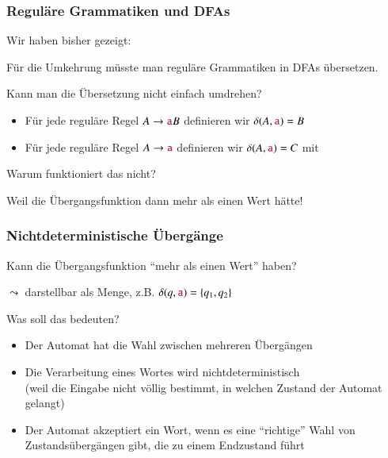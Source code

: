 \documentclass[aspectratio=1610,onlymath]{beamer}
\begin{document}
\begin{frame}\frametitle{Reguläre Grammatiken und DFAs}

Wir haben bisher gezeigt:


Für die Umkehrung müsste man reguläre Grammatiken in DFAs übersetzen.
\bigskip\pause

Kann man die Übersetzung nicht einfach umdrehen?
\begin{itemize}
\item Für jede reguläre Regel $A\to\mathtt{\textcolor{purple}{a}}B$ definieren wir $\delta(A,\mathtt{\textcolor{purple}{a}})=B$
\item Für jede reguläre Regel $A\to\mathtt{\textcolor{purple}{a}}$ definieren wir $\delta(A,\mathtt{\textcolor{purple}{a}})=C$ mit 
\end{itemize}
Warum funktioniert das nicht?\pause

\alert{Weil die Übergangsfunktion dann mehr als einen Wert hätte!}\medskip


\end{frame}

\begin{frame}\frametitle{Nichtdeterministische Übergänge}

Kann die Übergangsfunktion "`mehr als einen Wert"' haben?
\medskip

$\leadsto$ darstellbar als Menge, z.B. $\delta(q,\mathtt{\textcolor{purple}{a}}) =\{q_1, q_2\}$
\bigskip

Was soll das bedeuten?
\begin{itemize}
\item Der Automat hat die Wahl zwischen mehreren Übergängen
\item Die Verarbeitung eines Wortes wird \alert{nichtdeterministisch}\\
(weil die Eingabe nicht völlig bestimmt, in welchen Zustand der Automat gelangt)
\item Der Automat akzeptiert ein Wort, wenn es eine "`richtige"' Wahl von Zustandsübergängen gibt, die zu einem Endzustand führt
\end{itemize}


\end{frame}
\end{document}
